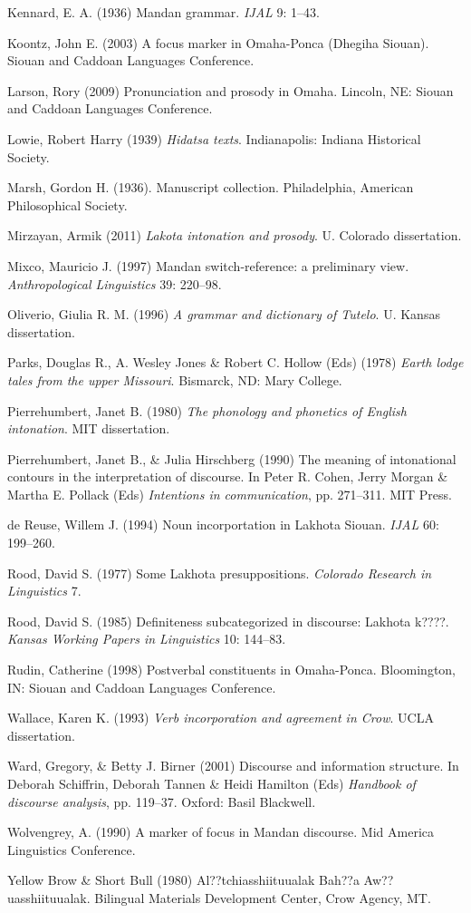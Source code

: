 \documentclass[output=paper]{LSP/langsci}
\begin{document}
\begin{reflist}
Kennard, E. A. (1936) Mandan grammar. \emph{IJAL} 9: 1--43.

Koontz, John E. (2003) A focus marker in Omaha-Ponca (Dhegiha Siouan). Siouan and Caddoan Languages Conference.

Larson, Rory (2009) Pronunciation and prosody in Omaha. Lincoln, NE: Siouan and Caddoan Languages Conference. 

Lowie, Robert Harry (1939) \emph{Hidatsa texts}. Indianapolis: Indiana Historical Society.

Marsh, Gordon H. (1936). Manuscript collection. Philadelphia, American Philosophical Society.

Mirzayan, Armik (2011) \emph{Lakota intonation and prosody}. U. Colorado dissertation.

Mixco, Mauricio J. (1997) Mandan switch-reference: a preliminary view. \emph{Anthropological Linguistics} 39: 220--98.

Oliverio, Giulia R. M. (1996) \emph{A grammar and dictionary of Tutelo}. U. Kansas dissertation.

Parks, Douglas R., A. Wesley Jones \& Robert C. Hollow (Eds) (1978) \emph{Earth lodge tales from the upper Missouri}. Bismarck, ND: Mary College.

Pierrehumbert, Janet B. (1980) \emph{The phonology and phonetics of English intonation}. MIT dissertation.

Pierrehumbert, Janet B., \& Julia Hirschberg (1990) The meaning of intonational contours in the interpretation of discourse. In Peter R. Cohen, Jerry Morgan \& Martha E. Pollack (Eds) \emph{Intentions in communication}, pp. 271--311. MIT Press.

de Reuse, Willem J. (1994) Noun incorportation in Lakhota Siouan. \emph{IJAL} 60: 199--260.

Rood, David S. (1977) Some Lakhota presuppositions. \emph{Colorado Research in Linguistics} 7.

Rood, David S. (1985) Definiteness subcategorized in discourse: Lakhota k????. \emph{Kansas Working Papers in Linguistics} 10: 144--83.

Rudin, Catherine (1998) Postverbal constituents in Omaha-Ponca. Bloomington, IN: Siouan and Caddoan Languages Conference. 

Wallace, Karen K. (1993) \emph{Verb incorporation and agreement in Crow}. UCLA dissertation.

Ward, Gregory, \& Betty J. Birner (2001) Discourse and information structure. In Deborah Schiffrin, Deborah Tannen \& Heidi Hamilton (Eds) \emph{Handbook of discourse analysis}, pp. 119--37. Oxford: Basil Blackwell.

Wolvengrey, A. (1990) A marker of focus in Mandan discourse. Mid America Linguistics Conference.

Yellow Brow \& Short Bull (1980) Al??tchiasshiituualak Bah??a Aw??uasshiituualak. Bilingual Materials Development Center, Crow Agency, MT.


\end{reflist}
\end{document}
